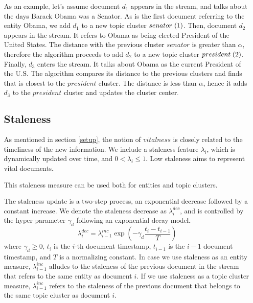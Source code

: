 \documentclass{article}
\begin{document}
As an example, let's assume document $d_1$ appears in the stream, and talks about the days Barack Obama was a Senator. As is the first document referring to the entity Obama, we add $d_1$ to a new topic cluster $senator\hspace{1mm}(1)$. Then, document $d_2$ appears in the stream. It refers to Obama as being elected President of the United States. The distance with the previous cluster $senator$ is greater than $\alpha$, therefore the algorithm proceeds to add $d_2$ to a new topic cluster $president\hspace{1mm}(2)$. Finally, $d_3$ enters the stream. It talks about Obama as the current President of the U.S. The algorithm compares its distance to the previous clusters and finds that is closest to the $president$ cluster. The distance is less than $\alpha$, hence it adds $d_3$ to the $president$ cluster and updates the cluster center.

\subsection{Staleness}
\label{staleness}

As mentioned in section \ref{setup}, the notion of $vitalness$ is closely related to the timeliness of the new information. We include a staleness feature $\lambda_i$, which is dynamically updated over time, and $0 < \lambda_i \leq 1$. Low staleness aims to represent vital documents.

This staleness measure can be used both for entities and topic clusters.

The staleness update is a two-step process, an exponential decrease followed by a constant increase.
We denote the staleness decrease as $\lambda^{dec}_i$, and is controlled by the hyper-parameter $\gamma_d$ following an exponential decay model.
\begin{equation}
\label{decrease}
\lambda^{dec}_i = \lambda^{inc}_{{i-1}} \exp{(-\gamma_d \frac{t_i-t_{i-1}}{T})}
\end{equation}
where $\gamma_d \geq 0$, $t_i$ is the $i$-th document timestamp, $t_{i-1}$ is the $i-1$ document timestamp, and $T$ is a normalizing constant.
In case we use staleness as an entity measure, $\lambda^{inc}_{i-1}$ alludes to the staleness of the previous document in the stream that refers to the same entity as document $i$.
If we use staleness as a topic cluster measure, $\lambda^{inc}_{i-1}$ refers to the staleness of the previous document that belongs to the same topic cluster as document $i$.
\end{document}
